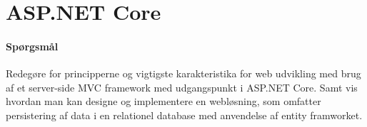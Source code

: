 \section{ASP.NET Core}

\paragraph{Spørgsmål}
Redegøre for principperne og vigtigste karakteristika for web udvikling med brug af et server-side MVC framework med udgangspunkt i ASP.NET Core. Samt vis hvordan man kan designe og implementere en webløsning, som omfatter persistering af data i en relationel database med anvendelse af entity framworket.
